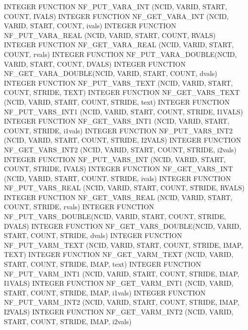 \begin{DoxyCode}
INTEGER FUNCTION  NF\_PUT\_VARA\_INT   (NCID, VARID, START, COUNT, IVALS)
INTEGER FUNCTION  NF\_GET\_VARA\_INT   (NCID, VARID, START, COUNT, ivals)
INTEGER FUNCTION  NF\_PUT\_VARA\_REAL  (NCID, VARID, START, COUNT, RVALS)
INTEGER FUNCTION  NF\_GET\_VARA\_REAL  (NCID, VARID, START, COUNT, rvals)
INTEGER FUNCTION  NF\_PUT\_VARA\_DOUBLE(NCID, VARID, START, COUNT, DVALS)
INTEGER FUNCTION  NF\_GET\_VARA\_DOUBLE(NCID, VARID, START, COUNT, dvals)
INTEGER FUNCTION  NF\_PUT\_VARS\_TEXT  (NCID, VARID, START, COUNT, STRIDE,
                                     TEXT)
INTEGER FUNCTION  NF\_GET\_VARS\_TEXT  (NCID, VARID, START, COUNT, STRIDE,
                                     text)
INTEGER FUNCTION  NF\_PUT\_VARS\_INT1  (NCID, VARID, START, COUNT, STRIDE,
                                     I1VALS)
INTEGER FUNCTION  NF\_GET\_VARS\_INT1  (NCID, VARID, START, COUNT, STRIDE,
                                     i1vals)
INTEGER FUNCTION  NF\_PUT\_VARS\_INT2  (NCID, VARID, START, COUNT, STRIDE,
                                     I2VALS)
INTEGER FUNCTION  NF\_GET\_VARS\_INT2  (NCID, VARID, START, COUNT, STRIDE,
                                     i2vals)
INTEGER FUNCTION  NF\_PUT\_VARS\_INT   (NCID, VARID, START, COUNT, STRIDE,
                                     IVALS)
INTEGER FUNCTION  NF\_GET\_VARS\_INT   (NCID, VARID, START, COUNT, STRIDE,
                                     ivals)
INTEGER FUNCTION  NF\_PUT\_VARS\_REAL  (NCID, VARID, START, COUNT, STRIDE,
                                     RVALS)
INTEGER FUNCTION  NF\_GET\_VARS\_REAL  (NCID, VARID, START, COUNT, STRIDE,
                                     rvals)
INTEGER FUNCTION  NF\_PUT\_VARS\_DOUBLE(NCID, VARID, START, COUNT, STRIDE,
                                     DVALS)
INTEGER FUNCTION  NF\_GET\_VARS\_DOUBLE(NCID, VARID, START, COUNT, STRIDE,
                                     dvals)
INTEGER FUNCTION  NF\_PUT\_VARM\_TEXT  (NCID, VARID, START, COUNT, STRIDE,
                                     IMAP, TEXT)
INTEGER FUNCTION  NF\_GET\_VARM\_TEXT  (NCID, VARID, START, COUNT, STRIDE,
                                     IMAP, text)
INTEGER FUNCTION  NF\_PUT\_VARM\_INT1  (NCID, VARID, START, COUNT, STRIDE,
                                     IMAP, I1VALS)
INTEGER FUNCTION  NF\_GET\_VARM\_INT1  (NCID, VARID, START, COUNT, STRIDE,
                                     IMAP, i1vals)
INTEGER FUNCTION  NF\_PUT\_VARM\_INT2  (NCID, VARID, START, COUNT, STRIDE,
                                     IMAP, I2VALS)
INTEGER FUNCTION  NF\_GET\_VARM\_INT2  (NCID, VARID, START, COUNT, STRIDE,
                                     IMAP, i2vals)

\end{DoxyCode}
